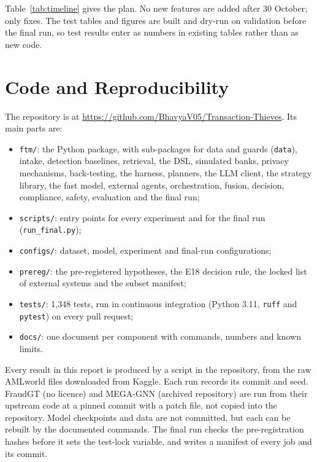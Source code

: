 \documentclass[11pt,a4paper]{article}
\begin{document}
Table~\ref{tab:timeline} gives the plan. No new features are added after 30 October; only fixes. The test tables and figures are built and dry-run on validation before the final run, so test results enter as numbers in existing tables rather than as new code.

\section{Code and Reproducibility}

The repository is at \url{https://github.com/BhavyaV05/Transaction-Thieves}. Its main parts are:
\begin{itemize}
\item \texttt{ftm/}: the Python package, with sub-packages for data and guards (\texttt{data}), intake, detection baselines, retrieval, the DSL, simulated banks, privacy mechanisms, back-testing, the harness, planners, the LLM client, the strategy library, the fast model, external agents, orchestration, fusion, decision, compliance, safety, evaluation and the final run;
\item \texttt{scripts/}: entry points for every experiment and for the final run (\texttt{run\_final.py});
\item \texttt{configs/}: dataset, model, experiment and final-run configurations;
\item \texttt{prereg/}: the pre-registered hypotheses, the E18 decision rule, the locked list of external systems and the subset manifest;
\item \texttt{tests/}: 1,348 tests, run in continuous integration (Python 3.11, \texttt{ruff} and \texttt{pytest}) on every pull request;
\item \texttt{docs/}: one document per component with commands, numbers and known limits.
\end{itemize}

Every result in this report is produced by a script in the repository, from the raw AMLworld files downloaded from Kaggle. Each run records its commit and seed. FraudGT (no licence) and MEGA-GNN (archived repository) are run from their upstream code at a pinned commit with a patch file, not copied into the repository. Model checkpoints and data are not committed, but each can be rebuilt by the documented commands. The final run checks the pre-registration hashes before it sets the test-lock variable, and writes a manifest of every job and its commit.
\end{document}
